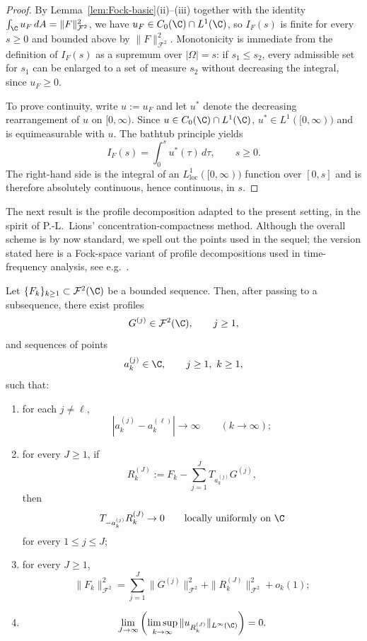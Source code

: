 \begin{proof}
By Lemma~\ref{lem:Fock-basic}(ii)--(iii) together with the identity
\(\int_\C u_F\,dA=\|F\|_{\mathcal F^2}^2\), we have
\(u_F\in C_0(\C)\cap L^1(\C)\), so \(I_F(s)\) is finite for every \(s\ge 0\)
and bounded above by \(\|F\|_{\mathcal F^2}^2\). Monotonicity is immediate
from the definition of \(I_F(s)\) as a supremum over \(|\Omega|=s\): if
\(s_1\le s_2\), every admissible set for \(s_1\) can be enlarged to a set of
measure \(s_2\) without decreasing the integral, since \(u_F\ge 0\).

To prove continuity, write \(u:=u_F\) and let \(u^*\) denote the decreasing
rearrangement of \(u\) on \([0,\infty)\). Since \(u\in C_0(\C)\cap L^1(\C)\),
\(u^*\in L^1([0,\infty))\) and is equimeasurable with \(u\). The bathtub
principle yields
\[
I_F(s)=\int_0^s u^*(\tau)\,d\tau,\qquad s\ge 0.
\]
The right-hand side is the integral of an
\(L^1_{\mathrm{loc}}([0,\infty))\) function over \([0,s]\) and is therefore
absolutely continuous, hence continuous, in \(s\).
\end{proof}

The next result is the profile decomposition adapted to the present setting,
in the spirit of P.-L.~Lions' concentration-compactness method. Although the
overall scheme is by now standard, we spell out the points used in the
sequel; the version stated here is a Fock-space variant of profile
decompositions used in time-frequency analysis, see e.g.\
\cite{Nicola-Romero-Trapasso, Marceca-Romero-Speckbacher, Fulsche-Hagger,
Samuelsen}.

\begin{proposition}\label{prop:profile-global}
Let \(\{F_k\}_{k\ge 1}\subset \mathcal F^2(\C)\) be a bounded sequence. Then,
after passing to a subsequence, there exist profiles
\[
G^{(j)}\in \mathcal F^2(\C),
\qquad j\ge 1,
\]
and sequences of points
\[
a_k^{(j)}\in \C,
\qquad j\ge 1,\ k\ge 1,
\]
such that:
\begin{enumerate}
    \item[(i)] for each \(j\neq \ell\),
    \[
    |a_k^{(j)}-a_k^{(\ell)}|\to \infty
    \qquad (k\to \infty);
    \]
    \item[(ii)] for every \(J\ge 1\), if
    \[
    R_k^{(J)}
    :=
    F_k-\sum_{j=1}^J T_{a_k^{(j)}}G^{(j)},
    \]
    then
    \[
    T_{-a_k^{(j)}}R_k^{(J)}\to 0
    \qquad\text{locally uniformly on }\C
    \]
    for every \(1\le j\le J\);
    \item[(iii)] for every \(J\ge 1\),
    \[
    \|F_k\|_{\mathcal F^2}^2
    =
    \sum_{j=1}^J \|G^{(j)}\|_{\mathcal F^2}^2
    +\|R_k^{(J)}\|_{\mathcal F^2}^2
    +o_k(1);
    \]
    \item[(iv)]
    \[
    \lim_{J\to\infty}\left(\limsup_{k\to\infty}
    \|u_{R_k^{(J)}}\|_{L^\infty(\C)}\right)=0.
    \]
\end{enumerate}
\end{proposition}

